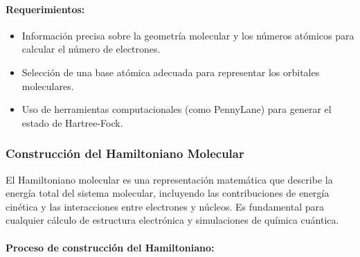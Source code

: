 \paragraph{Requerimientos:}

\begin{itemize}
    \item Información precisa sobre la geometría molecular y los números atómicos para calcular el número de electrones.
    \item Selección de una base atómica adecuada para representar los orbitales moleculares.
    \item Uso de herramientas computacionales (como PennyLane) para generar el estado de Hartree-Fock.
\end{itemize}

\subsubsection{Construcción del Hamiltoniano Molecular}

El Hamiltoniano molecular es una representación matemática que describe la energía total del sistema molecular, incluyendo las contribuciones de energía cinética y las interacciones entre electrones y núcleos. Es fundamental para cualquier cálculo de estructura electrónica y simulaciones de química cuántica.

\paragraph{Proceso de construcción del Hamiltoniano:}


